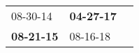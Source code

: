 \begin{supertabular}{p{0.33\columnwidth}p{0.33\columnwidth}p{0.33\columnwidth}}
          08-30-14\textsuperscript{} &  \textbf{04-27-17\textsuperscript{}} \\
 \textbf{08-21-15\textsuperscript{}} &           08-16-18\textsuperscript{} \\
\end{supertabular}
